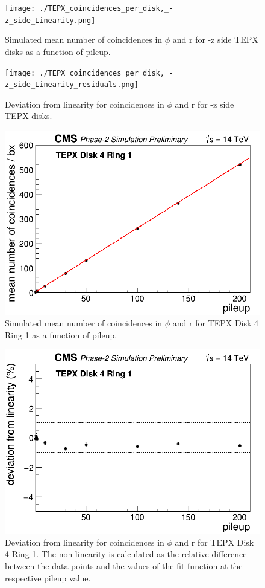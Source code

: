 \begin{figure}[H]
  \centering
  \texttt{[image: ./TEPX\_coincidences\_per\_disk,\_-z\_side\_Linearity.png]}
  \caption{Simulated mean number of coincidences in $\phi$ and r for -z side TEPX disks as a function of pileup.}
  \label{fig:CMS}
\end{figure}


\begin{figure}[H]
  \centering
  \texttt{[image: ./TEPX\_coincidences\_per\_disk,\_-z\_side\_Linearity\_residuals.png]}
  \caption{Deviation from linearity for coincidences in $\phi$ and r for -z side TEPX disks.}
  \label{fig:CMS}
\end{figure}


\begin{figure}[H]
  \centering
  \includegraphics[width=0.5\columnwidth]{./TEPX_Disk_4_Ring_1_mean_number_of_coincidences___bx_Linearity.png}
  \caption{Simulated mean number of coincidences in $\phi$ and r for TEPX Disk 4 Ring 1 as a function of pileup.}
  \label{fig:CMS}
\end{figure}


\begin{figure}[H]
  \centering
  \includegraphics[width=0.5\columnwidth]{./TEPX_Disk_4_Ring_1_mean_number_of_coincidences___bx_Linearity_residuals.png}
  \caption{Deviation from linearity for coincidences in $\phi$ and r for TEPX Disk 4 Ring 1. The non-linearity is calculated as the
relative difference between the data points and the values of the fit function at the respective pileup value.}
  \label{fig:CMS}
\end{figure}


